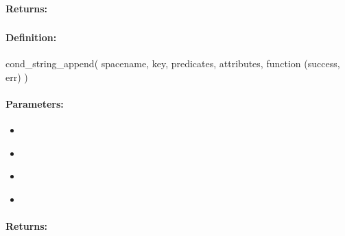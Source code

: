 \paragraph{Returns:}


\pagebreak
\subsubsection{}
\label{api:nodejs:cond_string_append}


\paragraph{Definition:}
\begin{javascriptcode}
cond_string_append(
        spacename, key, predicates, attributes, function (success, err) {})
\end{javascriptcode}
\paragraph{Parameters:}
\begin{itemize}[noitemsep]
\item {}\\

\item {}\\

\item {}\\

\item {}\\

\end{itemize}

\paragraph{Returns:}


\pagebreak
\subsubsection{}
\label{api:nodejs:list_lpush}


